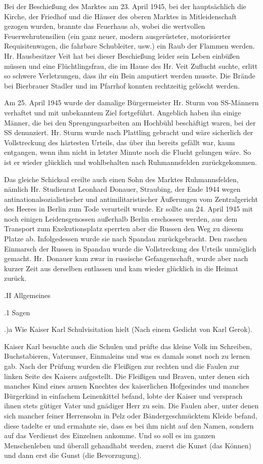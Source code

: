 Bei der Beschießung des Marktes am 23. April 1945, bei der hauptsächlich die
Kirche, der Friedhof und die Häuser des oberen Marktes in Mitleidenschaft
gezogen wurden, brannte das Feuerhaus ab, wobei die wertvollen
Feuerwehrutensilien (ein ganz neuer, modern ausgerüsteter, motorisierter
Requisitenwagen, die fahrbare Schubleiter, usw.) ein Raub der Flammen werden.
Hr. Hausbesitzer Veit hat bei dieser Beschießung leider sein Leben einbüßen
müssen und eine Flüchtlingsfrau, die im Hause des Hr. Veit Zuflucht suchte,
erlitt so schwere Verletzungen, dass ihr ein Bein amputiert werden musste. Die
Brände bei Bierbrauer Stadler und im Pfarrhof konnten rechtzeitig gelöscht
werden.

Am 25. April 1945 wurde der damalige Bürgermeister Hr. Sturm von SS-Männern
verhaftet und mit unbekanntem Ziel fortgeführt. Angeblich haben ihn einige
Männer, die bei den Sprengungsarbeiten am Hochbühl beschäftigt waren, bei der SS
denunziert. Hr. Sturm wurde nach Plattling gebracht und wäre sicherlich der
Vollstreckung des härtesten Urteils, das über ihn bereits gefällt war, kaum
entgangen, wenn ihm nicht in letzter Minute noch die Flucht gelungen wäre. So
ist er wieder glücklich und wohlbehalten nach Ruhmannsfelden zurückgekommen.

Das gleiche Schicksal ereilte auch einen Sohn des Marktes Ruhmannsfelden,
nämlich Hr. Studienrat Leonhard Donauer, Straubing, der Ende 1944 wegen
antinationalsozialistischer und antimilitaristischer Äußerungen vom
Zentralgericht des Heeres in Berlin zum Tode verurteilt wurde. Er sollte am 24.
April 1945 mit noch einigen Leidensgenossen außerhalb Berlin erschossen werden,
aus dem Transport zum Exekutionsplatz sperrten aber die Russen den Weg zu diesem
Platze ab. Infolgedessen wurde sie nach Spandau zurückgebracht. Den raschen
Einmarsch der Russen in Spandau wurde die Vollstreckung des Urteils unmöglich
gemacht. Hr. Donauer kam zwar in russische Gefangenschaft, wurde aber nach
kurzer Zeit aus derselben entlassen und kam wieder glücklich in die Heimat
zurück.

.II Allgemeines

.1 Sagen

.)a Wie Kaiser Karl Schulvisitation hielt (Nach einem Gedicht von Karl Gerok).

Kaiser Karl besuchte auch die Schulen und prüfte das kleine Volk im Schreiben,
Buchstabieren, Vaterunser, Einmaleins und was es damals sonst noch zu lernen
gab. Nach der Prüfung wurden die Fleißigen zur rechten und die Faulen zur linken
Seite des Kaisers aufgestellt. Die Fleißigen und Braven, unter denen sich
manches Kind eines armen Knechtes des kaiserlichen Hofgesindes und manches
Bürgerkind in einfachem Leinenkittel befand, lobte der Kaiser und versprach
ihnen stets gütiger Vater und gnädiger Herr zu sein. Die Faulen aber, unter
denen sich mancher feiner Herrensohn in Pelz oder Bändergeschmücktem Kleide
befand, diese tadelte er und ermahnte sie, dass es bei ihm nicht auf den Namen,
sondern auf das Verdienst des Einzelnen ankomme. Und so soll es im ganzen
Menschenleben und überall gehandhabt werden, zuerst die Kunst (das Können) und
dann erst die Gunst (die Bevorzugung).



